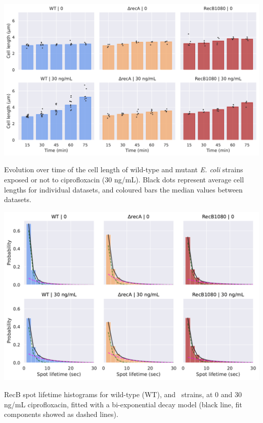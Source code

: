 \begin{suppfigure*}[htbp]
    \begin{center}
    \includegraphics[width=.8\textwidth]{SI_Figures/Mutants_cell_lengths.pdf}
    \end{center}
    \caption{Evolution over time of the cell length of wild-type and mutant \emph{E. coli} strains exposed or not to ciprofloxacin (30 ng/mL). Black dots represent average cell lengths for individual datasets, and coloured bars the median values between datasets.}
    \label{SIFig:mutants_cell_lengths}
\end{suppfigure*}

\begin{suppfigure*}[htbp]
    \begin{center}
    \includegraphics[width=.8\textwidth]{SI_Figures/Mutants_RecB_fits.pdf}
    \end{center}
    \caption{RecB spot lifetime histograms for wild-type (WT), \dreca and \teneighty\ strains, at 0 and 30 ng/mL ciprofloxacin, fitted with a bi-exponential decay model (black line, fit components showed as dashed lines).}
    \label{SIFig:mutants_biexp_fits}
\end{suppfigure*}

